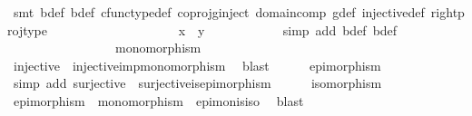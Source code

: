 \begin{isabellebody}
\ {\isacharparenleft}{\kern0pt}smt\ b{\isacharprime}{\kern0pt}{\isacharunderscore}{\kern0pt}def\ b{\isacharunderscore}{\kern0pt}def\ cfunc{\isacharunderscore}{\kern0pt}type{\isacharunderscore}{\kern0pt}def\ coproj{\isacharunderscore}{\kern0pt}g{\isacharunderscore}{\kern0pt}inject\ domain{\isacharunderscore}{\kern0pt}comp\ g{\isacharunderscore}{\kern0pt}def\ injective{\isacharunderscore}{\kern0pt}def\ right{\isacharunderscore}{\kern0pt}proj{\isacharunderscore}{\kern0pt}type{\isacharparenright}{\kern0pt}\isanewline
\ \ \ \ \ \ \ \ \isamarkupfalse%
\isanewline
\ \ \ \ \ \ \ \ \isamarkupfalse%
\ \isamarkupfalse%
\ {\isachardoublequoteopen}x\ {\isacharequal}{\kern0pt}\ y{\isachardoublequoteclose}\isanewline
\ \ \ \ \ \ \ \ \ \ \isamarkupfalse%
\ {\isacharparenleft}{\kern0pt}simp\ add{\isacharcolon}{\kern0pt}\ b{\isacharprime}{\kern0pt}{\isacharunderscore}{\kern0pt}def{\isacharparenleft}{\kern0pt}{}{\isacharparenright}{\kern0pt}\ b{\isacharunderscore}{\kern0pt}def{\isacharparenright}{\kern0pt}\isanewline
\ \ \ \ \ \ \ \ \isamarkupfalse%
\isanewline
\ \ \ \ \ \ \isamarkupfalse%
\isanewline
\ \ \ \ \isamarkupfalse%
\isanewline
\isanewline
\ \ \ \ \isamarkupfalse%
\ {\isachardoublequoteopen}monomorphism\ {\isasymphi}{\isachardoublequoteclose}\isanewline
\ \ \ \ \ \ \isamarkupfalse%
\ {\isacartoucheopen}injective\ {\isasymphi}{\isacartoucheclose}\ injective{\isacharunderscore}{\kern0pt}imp{\isacharunderscore}{\kern0pt}monomorphism\ \isamarkupfalse%
\ blast\isanewline
\ \ \ \ \isamarkupfalse%
\ {\isachardoublequoteopen}epimorphism\ {\isasymphi}{\isachardoublequoteclose}\isanewline
\ \ \ \ \ \ \isamarkupfalse%
\ {\isacharparenleft}{\kern0pt}simp\ add{\isacharcolon}{\kern0pt}\ {\isacartoucheopen}surjective\ {\isasymphi}{\isacartoucheclose}\ surjective{\isacharunderscore}{\kern0pt}is{\isacharunderscore}{\kern0pt}epimorphism{\isacharparenright}{\kern0pt}\isanewline
\ \ \ \ \isamarkupfalse%
\ {\isachardoublequoteopen}isomorphism\ {\isasymphi}{\isachardoublequoteclose}\isanewline
\ \ \ \ \ \ \isamarkupfalse%
\ {\isacartoucheopen}epimorphism\ {\isasymphi}{\isacartoucheclose}\ {\isacartoucheopen}monomorphism\ {\isasymphi}{\isacartoucheclose}\ epi{\isacharunderscore}{\kern0pt}mon{\isacharunderscore}{\kern0pt}is{\isacharunderscore}{\kern0pt}iso\ \isamarkupfalse%
\ blast\isanewline
\ \ \ \ \isamarkupfalse%

\end{isabellebody}
